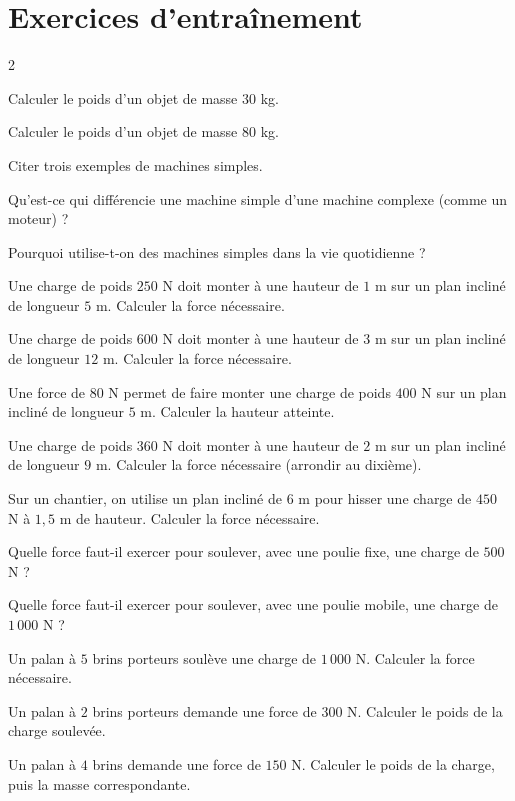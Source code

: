 \section{Exercices d'entraînement}
\begin{multicols}{2}

\exo{} Calculer le poids d'un objet de masse $30$ kg.

\exo{} Calculer le poids d'un objet de masse $80$ kg.

\exo{} Citer trois exemples de machines simples.

\exo{} Qu'est-ce qui différencie une machine simple d'une machine complexe (comme
un moteur) ?

\exo{} Pourquoi utilise-t-on des machines simples dans la vie quotidienne ?

\exo{} Une charge de poids $250$ N doit monter à une hauteur de $1$ m sur un plan
incliné de longueur $5$ m. Calculer la force nécessaire.

\exo{} Une charge de poids $600$ N doit monter à une hauteur de $3$ m sur un plan
incliné de longueur $12$ m. Calculer la force nécessaire.

\exo{} Une force de $80$ N permet de faire monter une charge de poids $400$ N sur
un plan incliné de longueur $5$ m. Calculer la hauteur atteinte.

\exo{} Une charge de poids $360$ N doit monter à une hauteur de $2$ m sur un plan
incliné de longueur $9$ m. Calculer la force nécessaire (arrondir au dixième).

\exo{} Sur un chantier, on utilise un plan incliné de $6$ m pour hisser une charge
de $450$ N à $1{,}5$ m de hauteur. Calculer la force nécessaire.

\exo{} Quelle force faut-il exercer pour soulever, avec une poulie fixe, une
charge de $500$ N ?

\exo{} Quelle force faut-il exercer pour soulever, avec une poulie mobile, une
charge de $1\,000$ N ?

\exo{} Un palan à $5$ brins porteurs soulève une charge de $1\,000$ N. Calculer
la force nécessaire.

\exo{} Un palan à $2$ brins porteurs demande une force de $300$ N. Calculer le
poids de la charge soulevée.

\exo{} Un palan à $4$ brins demande une force de $150$ N. Calculer le poids de la
charge, puis la masse correspondante.


\end{multicols}
